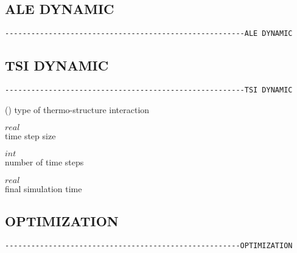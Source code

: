 




\subsection{ALE DYNAMIC}
\begin{verbatim}
-------------------------------------------------------ALE DYNAMIC
\end{verbatim}


\subsection{TSI DYNAMIC}
\begin{verbatim}
-------------------------------------------------------TSI DYNAMIC
\end{verbatim}

 (\kor{}\kor{})
type of thermo-structure interaction

 $real$\\
time step size

 $int$\\
number of time steps

 $real$\\
final simulation time

\subsection{OPTIMIZATION}
\begin{verbatim}
------------------------------------------------------OPTIMIZATION
\end{verbatim}


